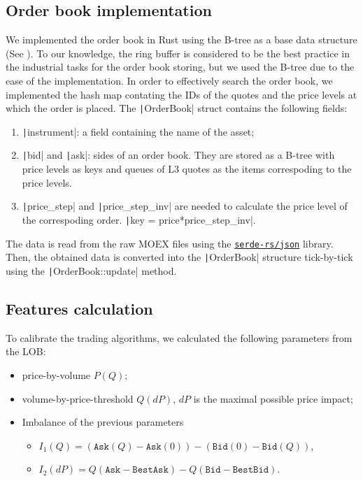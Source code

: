     \subsection{Order book implementation}
        We implemented the order book in Rust using the B-tree as a base data structure (See \Cite{Cormen2022}). To our knowledge, 
        the ring buffer is considered to be the best practice in the industrial tasks for the order book storing, but we used 
        the B-tree due to the ease of the implementation.
        In order to effectively search the order book, we implemented the hash map contating the IDs of the quotes and
        the price levels at which the order is placed. The \texttt|OrderBook| struct contains the following fields:
        \begin{enumerate}
            \item \texttt|instrument|: a field containing the name of the asset;
            \item \texttt|bid| and \texttt|ask|: sides of an order book. They are 
                stored as a B-tree with price levels as keys and queues of L3 quotes as the items correspoding
                to the price levels.
            \item \texttt|price_step| and \texttt|price_step_inv| are needed to calculate the 
                price level of the correspoding order. \texttt|key = price*price_step_inv|.
        \end{enumerate}
        The data is read from the raw MOEX files using the \href{github.com/serde-rs/json}{\texttt{serde-rs/json}} library. Then, the obtained data is
        converted into the \texttt|OrderBook| structure tick-by-tick using the \texttt|OrderBook::update| method.

    \subsection{Features calculation}
        To calibrate the trading algorithms, we calculated the following parameters from the LOB:
        \begin{itemize}
            \item price-by-volume $P(Q)$;
            \item volume-by-price-threshold $Q(dP)$, $dP$ is the maximal possible price impact;
            \item Imbalance of the previous parameters\begin{itemize}
                \item $I_1(Q) = (\texttt{Ask}(Q) - \texttt{Ask}(0)) - (\texttt{Bid}(0) - \texttt{Bid}(Q))$,
                \item $I_2(dP) = Q(\texttt{Ask} - \texttt{BestAsk}) - Q(\texttt{Bid} - \texttt{BestBid})$.
            \end{itemize}
        \end{itemize}

